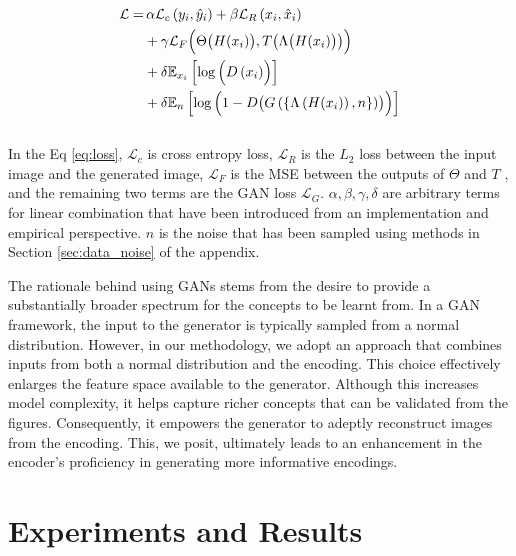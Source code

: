 \documentclass[letterpaper]{article}
\begin{document}
\begin{equation}
\begin{aligned}\label{eq:loss}
    \mathcal{L} = & \, \alpha\mathcal{L}_c\left(y_i, \hat{y}_i\right) + \beta \mathcal{L}_R\left(x_i, \hat{x}_i\right)\\
    &+ \gamma \mathcal{L}_F\Bigl(\Theta\bigl(H(x_i)\bigr), T\bigl(\Lambda\bigl(H(x_i)\bigr)\bigr)\Bigr) \\
    & + \delta\mathbb{E}_{x_i}\left[\log\,\Bigl(D\left(x_i\right)\Bigr)\right]\\ &+ \delta\mathbb{E}_{n}\left[\log\,\Bigl(1-D\bigl(G\left(\{\Lambda\left(H(x_i)\right), n\}\right)\bigr)\Bigr)\right]
\end{aligned}
\end{equation}\\

In the Eq \ref{eq:loss}, $\mathcal{L}_c$ is cross entropy loss, $\mathcal{L}_R$ is the $L_2$ loss between the input image and the generated image, $\mathcal{L}_F$ is the MSE between the outputs of $\Theta$ and $T$ \cite{SENN, Sarkar2021AFF, bastani}, and the remaining two terms are the GAN loss $\mathcal{L}_G$. $\alpha, \beta, \gamma, \delta$ are arbitrary terms for linear combination that have been introduced from an implementation and empirical perspective. 
$n$ is the noise that has been sampled using methods in Section \ref{sec:data_noise} of the appendix.

The rationale behind using GANs stems from the desire to provide a substantially broader spectrum for the concepts to be learnt from. In a GAN framework, the input to the generator is typically sampled from a normal distribution. However, in our methodology, we adopt an approach that combines inputs from both a normal distribution and the encoding. This choice effectively enlarges the feature space available to the generator. Although this increases model complexity, it helps capture richer concepts that can be validated from the figures. Consequently, it empowers the generator to adeptly reconstruct images from the encoding. This, we posit, ultimately leads to an enhancement in the encoder's proficiency in generating more informative encodings.

\section{Experiments and Results}\label{sec:exp}
\end{document}
